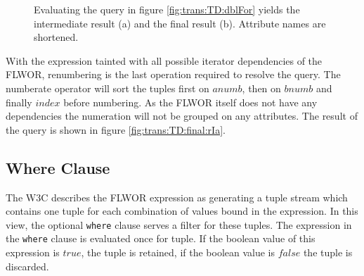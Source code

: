 \begin{myExample}
\begin{figure}[h]
\centering
{}
\qquad
{}
\caption[Example: resolving simple FLWOR]{Evaluating the query in figure \ref{fig:trans:TD:dblFor} yields the
intermediate result (a) and the final result (b). Attribute names are shortened.\label{fig:trans:TD:finalizeExp}}
\end{figure}

With the expression tainted with all possible iterator dependencies of the FLWOR, renumbering is the last
operation required to resolve the query. The \textsf{numberate} operator will sort the tuples first on $anumb$,
then on $bnumb$ and finally $index$ before numbering. As the FLWOR itself does not have any dependencies the
numeration will not be grouped on any attributes. The result of the query is shown in figure
\ref{fig:trans:TD:final:rIa}.
\end{myExample}

\subsection{Where Clause}
The W3C describes the FLWOR expression as generating a tuple stream which contains one tuple for each combination
of values bound in the expression\cite{w3c00}. In this view, the optional \texttt{where} clause serves a filter for
these tuples. The expression in the \texttt{where} clause is evaluated once for tuple. If the boolean value of this
expression is $true$, the tuple is retained, if the boolean value is $false$ the tuple is discarded.

